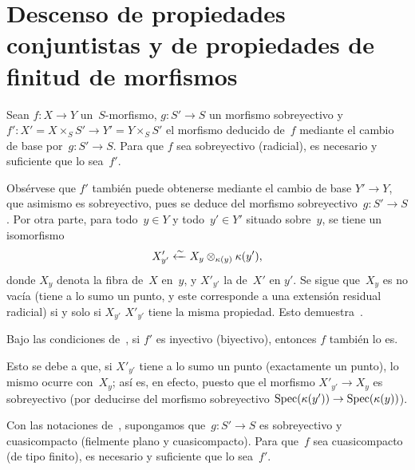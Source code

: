 \section[Descenso de propiedades conjuntistas]{Descenso de propiedades
conjuntistas y de propiedades de finitud de morfismos\protect\footnotemark}
\label{VIII.3}



\begin{proposition}
\label{VIII.3.1}
Sean $f\colon X\to Y$ un~$S$-morfismo, $g\colon S'\to S$ un morfismo
sobreyectivo y $f'\colon X'=X\times_{S}S'\to Y'=Y\times_{S}S'$ el morfismo
deducido de~$f$ mediante el cambio de base por~$g\colon S'\to S$. Para que
$f$ sea sobreyectivo (\resp radicial), es necesario y suficiente que lo
sea~$f'$.
\end{proposition}

Obsérvese que $f'$ también puede obtenerse mediante el cambio de base
$Y'\to Y$, que asimismo es sobreyectivo, pues se deduce del morfismo
sobreyectivo~$g\colon S'\to S$. Por otra parte, para todo~$y\in Y$ y
todo~$y'\in Y'$ situado sobre~$y$, se tiene un isomorfismo
$$
X'_{y'}\xleftarrow{\sim} X_{y}\otimes_{\kappa(y)}\kappa(y'),
$$
donde $X_{y}$ denota la fibra de~$X$ en~$y$, y $X'_{y'}$ la de~$X'$ en
$y'$. Se sigue que~$X_{y}$ es no vacía (\resp tiene a lo sumo un punto, y
este corresponde a una extensión residual radicial) si y solo si
{$X_{y'}$}
{$X'_{y'}$}
tiene la misma propiedad. Esto demuestra~.

\begin{corollaire}
\label{VIII.3.2}
Bajo las condiciones de~, si $f'$ es inyectivo
(\resp biyectivo), entonces $f$ también lo es.
\end{corollaire}

Esto se debe a que, si $X'_{y'}$ tiene a lo sumo un punto
(\resp exactamente un punto), lo mismo ocurre con~$X_{y}$; así es, en
efecto, puesto que el morfismo $X'_{y'}\to X_{y}$ es sobreyectivo (por
deducirse del morfismo sobreyectivo
$\operatorname{Spec}(\kappa(y'))\to \operatorname{Spec}(\kappa(y))$).

\begin{proposition}
\label{VIII.3.3}
Con las notaciones de~, supongamos que~$g\colon S'\to S$ es
sobreyectivo y cuasicompacto (\resp fielmente plano y cuasicompacto). Para
que~$f$ sea cuasicompacto (\resp de tipo finito), es necesario y suficiente
que lo sea~$f'$.
\end{proposition}

